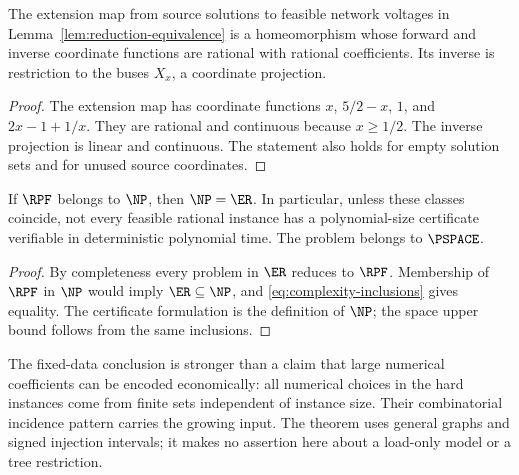 \begin{proposition}
\label{prop:rational-bijection}
The extension map from source solutions to feasible network voltages in
Lemma~\ref{lem:reduction-equivalence} is a homeomorphism whose forward and
inverse coordinate functions are rational with rational coefficients.
Its inverse is restriction to the buses $X_x$, a coordinate projection.
\end{proposition}
\begin{proof}
The extension map has coordinate functions $x$, $5/2-x$, $1$, and
$2x-1+1/x$. They are rational and continuous because $x\ge1/2$.
The inverse projection is linear and continuous. The statement also holds
for empty solution sets and for unused source coordinates.
\end{proof}

\begin{corollary}
\label{cor:rpf-np}
If $\RPF$ belongs to $\NP$, then $\NP=\ER$. In particular, unless these
classes coincide, not every feasible rational instance has a polynomial-size
certificate verifiable in deterministic polynomial time. The problem belongs
to $\PSPACE$.
\end{corollary}
\begin{proof}
By completeness every problem in $\ER$ reduces to $\RPF$. Membership of
$\RPF$ in $\NP$ would imply $\ER\subseteq\NP$, and
\eqref{eq:complexity-inclusions} gives equality. The certificate formulation
is the definition of $\NP$; the space upper bound follows from the same
inclusions.
\end{proof}

The fixed-data conclusion is stronger than a claim that large numerical
coefficients can be encoded economically: all numerical choices in the
hard instances come from finite sets independent of instance size. Their
combinatorial incidence pattern carries the growing input. The theorem uses
general graphs and signed injection intervals; it makes no assertion here
about a load-only model or a tree restriction.
